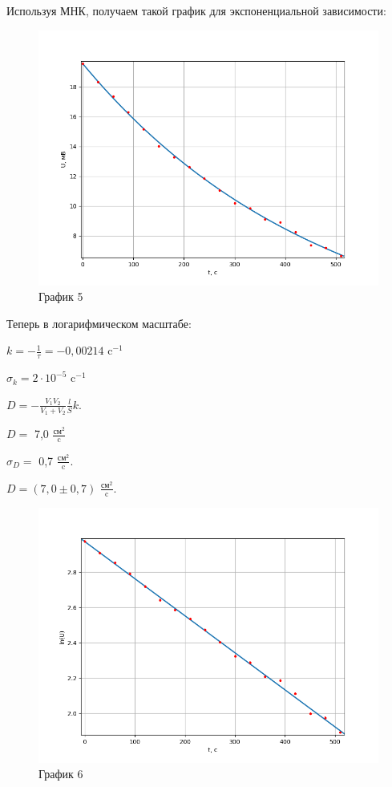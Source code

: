 \documentclass[a4paper,12pt]{article} %
\begin{document}
\begin{enumerate}
Используя МНК, получаем такой график для экспоненциальной зависимости:
\begin{figure}[h!]
	\centering
	\includegraphics[scale=0.8]{Pictures/График2(эксп).png}
	\caption*{График 5}
\end{figure}

Теперь в логарифмическом масштабе:

$k = -\frac{1}{\tau} = -0,00214$ c$^{-1}$

$\sigma_{k} = 2\cdot 10^{-5}$ c$^{-1}$

$D = - \frac{V_{1}V_{2}}{V_{1} + V_{2}}\frac{l}{S}k$.

$D = $ 7,0 $\frac{\text{см}^2}{\text{c}}$

$\sigma_{D} = $ 0,7 $\frac{\text{см}^2}{\text{c}}$.
\vspace{15mm}

$D = (7,0 \pm 0,7)$ $\frac{\text{см}^2}{\text{c}}$.
\newpage
\begin{figure}[h!]
	\centering
	\includegraphics[scale=0.8]{Pictures/График2(лин).png}
	\caption*{График 6}
\end{figure}


\end{enumerate}
\end{document}
